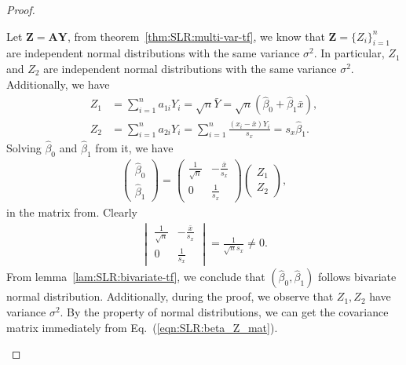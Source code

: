 \documentclass{book}
\begin{document}
\begin{proof}
\begin{enumerate}
Let $\mathbf{Z} = \mathbf{A}\mathbf{Y}$, from theorem~\ref{thm:SLR:multi-var-tf}, we know that $\mathbf{Z} = \{Z_i\}_{i=1}^{n}$ are independent normal distributions with the same variance $\sigma^2$. In particular, $Z_1$ and $Z_2$ are independent normal distributions with the same variance $\sigma^2$. Additionally, we have 
\begin{align*}
    Z_1 &= \sum_{i=1}^n a_{1i} Y_{i} = \sqrt{n}\bar{Y} = \sqrt{n}(\hat{\beta}_0 + \hat{\beta}_1\bar{x}) ,\\
    Z_2 &= \sum_{i=1}^n a_{2i} Y_{i} = \sum_{i=1}^n\frac{(x_i-\bar{x})Y_i}{s_x} = s_x\hat{\beta}_1.
\end{align*}
Solving $\hat{\beta}_0$ and $\hat{\beta}_1$ from it, we have
\begin{align}
    \label{eqn:SLR:beta_Z_mat}
    \begin{pmatrix}
        \hat\beta_0 \\ \hat\beta_1
    \end{pmatrix}
    =
    \begin{pmatrix}
        \frac{1}{\sqrt{n}} & - \frac{\bar{x}}{s_x}\\
        0 & \frac{1}{s_x}
    \end{pmatrix}
    \begin{pmatrix}
        Z_1\\Z_2
    \end{pmatrix},
\end{align}
in the matrix from. Clearly 
\begin{align*}
    \begin{vmatrix}
        \frac{1}{\sqrt{n}} & - \frac{\bar{x}}{s_x}\\
        0 & \frac{1}{s_x}
    \end{vmatrix}
    = 
    \frac{1}{\sqrt{n}s_x} \neq 0.
\end{align*}
From lemma~\ref{lam:SLR:bivariate-tf}, we conclude that $(\hat{\beta}_0, \hat{\beta}_1)$ follows bivariate normal distribution. Additionally, during the proof, we observe that $Z_1, Z_2$ have variance $\sigma^2$. By the property of normal distributions, we can get the covariance matrix immediately from Eq.~(\ref{eqn:SLR:beta_Z_mat}).


\end{enumerate}
\end{proof}
\end{document}
